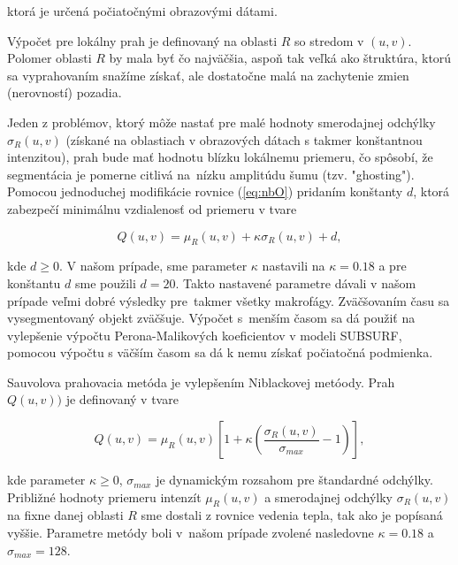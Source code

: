 \documentclass[a4paper,11pt,oneside]{article}%
\begin{document}
ktorá je určená počiatočnými obrazovými dátami.

Výpočet pre lokálny prah je definovaný na oblasti $R$ so stredom v $(u, v)$. Polomer oblasti $R$ by mala byť čo najväčšia, aspoň tak veľká ako štruktúra, ktorú sa vyprahovaním snažíme získať, ale dostatočne malá na zachytenie zmien (nerovností) pozadia.

Jeden z problémov, ktorý môže nastať pre malé hodnoty smerodajnej odchýlky $\sigma_R(u,v)$ (získané na oblastiach v obrazových dátach s takmer konštantnou intenzitou), prah bude mať hodnotu blízku lokálnemu priemeru, čo spôsobí, že segmentácia je pomerne citlivá na~nízku amplitúdu šumu (tzv. "ghosting"). Pomocou jednoduchej modifikácie rovnice (\ref{eq:nbO}) pridaním konštanty $d$, ktorá zabezpečí minimálnu vzdialenosť od priemeru v tvare

\begin{equation} \label{eq:nb}
Q(u,v) = \mu_R(u,v) + \kappa\sigma_R(u,v) + d,
\end{equation}

kde $d \geq 0$. V našom prípade, sme parameter $\kappa$ nastavili na $\kappa = 0.18$ a pre konštantu $d$ sme použili $d = 20$. Takto nastavené parametre dávali v našom prípade veľmi dobré výsledky pre~takmer všetky makrofágy. Zväčšovaním času sa vysegmentovaný objekt zväčšuje. Výpočet s~menším časom sa dá použiť na vylepšenie výpočtu Perona-Malikových koeficientov v modeli SUBSURF, pomocou výpočtu  s väčším časom sa dá k nemu získať počiatočná podmienka.


Sauvolova prahovacia metóda je vylepšením Niblackovej metóody. Prah $Q(u,v))$ je definovaný v tvare

\begin{equation}  \label{eq:sav}
Q(u,v) = \mu_R(u,v) \left[1 + \kappa\left(\frac{\sigma_R(u,v)}{\sigma_{max}} - 1\right)\right],
\end{equation}

kde parameter $\kappa \geq 0$, $\sigma_{max}$ je dynamickým rozsahom pre štandardné odchýlky. Približné hodnoty priemeru intenzít $\mu_R(u,v)$ a smerodajnej odchýlky  $\sigma_R(u,v)$ na fixne danej oblasti $R$ sme dostali z rovnice vedenia tepla, tak ako je popísaná vyššie. 
Parametre metódy boli v~našom prípade zvolené nasledovne $\kappa = 0.18$ a  $\sigma_{max} = 128$. 
\end{document}
